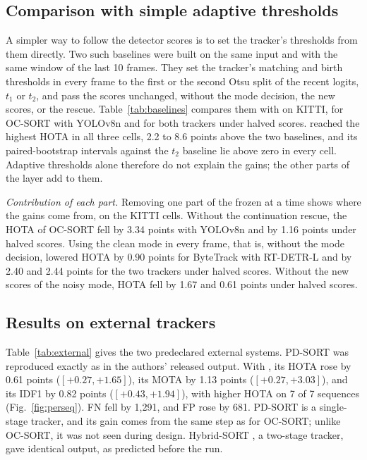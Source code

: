 \subsection{Comparison with simple adaptive thresholds}\label{sec:baselines}
A simpler way to follow the detector scores is to set the tracker's
thresholds from them directly. Two such baselines were built on the same
input and with the same window of the last 10 frames. They set the tracker's
matching and birth thresholds in every frame to the first or the second Otsu
split of the recent logits, $t_1$ or $t_2$, and pass the scores unchanged,
without the mode decision, the new scores, or the rescue.
Table~\ref{tab:baselines} compares them with \scl{} on KITTI, for OC-SORT
with YOLOv8n and for both trackers under halved scores. \scl{} reached the
highest HOTA in all three cells, 2.2 to 8.6 points above the two baselines,
and its paired-bootstrap intervals against the $t_2$ baseline lie
above zero in every cell. Adaptive thresholds alone therefore do not explain
the gains; the other parts of the layer add to them.

\emph{Contribution of each part.} Removing one part of the frozen \scl{} at
a time shows where the gains come from, on the KITTI cells. Without the
continuation rescue, the HOTA of OC-SORT fell by 3.34 points with YOLOv8n and
by 1.16 points under halved scores. Using the clean mode in every frame,
that is, without the mode decision, lowered HOTA by 0.90 points
for ByteTrack with RT-DETR-L and by 2.40 and 2.44 points for the two trackers
under halved scores. Without the new scores of the noisy mode, HOTA fell by
1.67 and 0.61 points under halved scores.



\subsection{Results on external trackers}\label{sec:external}
Table~\ref{tab:external} gives the two predeclared external systems. PD-SORT
\cite{wang2025pdsort} was reproduced exactly as in the authors' released
output. With \scl{}, its HOTA rose by 0.61 points ($[+0.27,+1.65]$), its
MOTA by 1.13 points ($[+0.27,+3.03]$), and its IDF1 by 0.82 points
($[+0.43,+1.94]$), with higher HOTA on 7 of 7 sequences
(Fig.~\ref{fig:perseq}). FN fell by 1,291, and FP rose by 681. PD-SORT is a single-stage tracker, and its gain comes from the same
step as for OC-SORT; unlike OC-SORT, it was not seen during design.
Hybrid-SORT \cite{yang2024hybridsort}, a two-stage tracker, gave identical
output, as predicted before the run.

